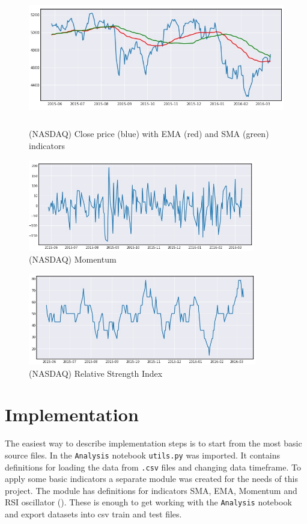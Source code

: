 \documentclass[a4paper,12pt]{article}
\begin{document}
\begin{figure}[h]
	\includegraphics[height=6cm,width=\textwidth]{nasdaqClose}
	\caption{(NASDAQ) Close price (blue) with EMA (red) and SMA (green) indicators}
	\centering
\end{figure}
\begin{figure}[h]
	\includegraphics[height=4cm,width=\textwidth]{nasdaqMom}
	\caption{(NASDAQ) Momentum}
	\centering
\end{figure}
\begin{figure}[h]
	\includegraphics[height=4cm,width=\textwidth]{nasdaqRSI}
	\caption{(NASDAQ) Relative Strength Index}
	\centering
\end{figure}

\section{Implementation}
The easiest way to describe implementation steps is to start from the most basic source files.
In the \texttt{Analysis} notebook \texttt{utils.py} was imported. It contains definitions for loading the data from \texttt{.csv} files and changing data timeframe. To apply some basic indicators a separate module was created for the needs of this project. The module has definitions for indicators SMA, EMA, Momentum and RSI oscillator (\cite{Indicies}). These is enough to get working with the \texttt{Analysis} notebook and export datasets into csv train and test files.
\end{document}
